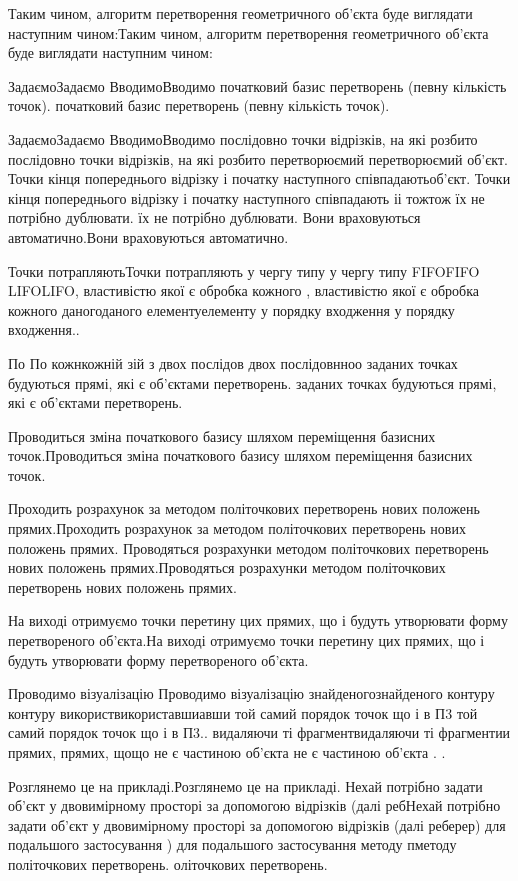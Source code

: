 \documentclass[12pt,a4paper]{article}
\begin{document}
\par
Таким чином, алгоритм перетворення геометричного об’єкта буде виглядати наступним чином:Таким чином, алгоритм перетворення геометричного об’єкта буде виглядати наступним чином:
\par
ЗадаємоЗадаємо  ВводимоВводимо початковий базис перетворень (певну кількість точок).  початковий базис перетворень (певну кількість точок).
\par
ЗадаємоЗадаємо  ВводимоВводимо  послідовно точки відрізків, на які розбито послідовно точки відрізків, на які розбито перетворюємий перетворюємий об’єкт. Точки кінця попереднього відрізку і початку наступного співпадаютьоб’єкт. Точки кінця попереднього відрізку і початку наступного співпадають  іі  тожтож їх не потрібно дублювати.  їх не потрібно дублювати. Вони враховуються автоматично.Вони враховуються автоматично.
\par
Точки потрапляютьТочки потрапляють у чергу типу  у чергу типу FIFOFIFO  LIFOLIFO, властивістю якої є обробка кожного , властивістю якої є обробка кожного даногоданого  елементуелементу у порядку входження у порядку входження..
\par
По По кожнкожній зій з двох послідов двох послідовнноо заданих точках будуються прямі, які є об’єктами перетворень. заданих точках будуються прямі, які є об’єктами перетворень.
\par
Проводиться зміна початкового базису шляхом переміщення базисних точок.Проводиться зміна початкового базису шляхом переміщення базисних точок.
\par
Проходить розрахунок за методом політочкових перетворень нових положень прямих.Проходить розрахунок за методом політочкових перетворень нових положень прямих.  Проводяться розрахунки методом політочкових перетворень нових положень прямих.Проводяться розрахунки методом політочкових перетворень нових положень прямих.
\par
На виході отримуємо точки перетину цих прямих, що і будуть утворювати форму перетвореного об’єкта.На виході отримуємо точки перетину цих прямих, що і будуть утворювати форму перетвореного об’єкта.
\par
Проводимо візуалізацію Проводимо візуалізацію знайденогознайденого контуру контуру  використвикориставшиавши той самий порядок точок що і в П3 той самий порядок точок що і в П3..  видаляючи ті фрагментвидаляючи ті фрагментии прямих,  прямих, щощо не є частиною об’єкта не є частиною об’єкта  . .
\par
Розглянемо це на прикладі.Розглянемо це на прикладі.  Нехай потрібно задати об’єкт у двовимірному просторі за допомогою відрізків (далі ребНехай потрібно задати об’єкт у двовимірному просторі за допомогою відрізків (далі реберер) для подальшого застосування ) для подальшого застосування методу пметоду політочкових перетворень. оліточкових перетворень.
\end{document}
